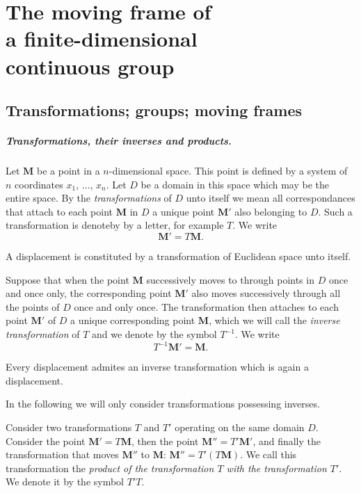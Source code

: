 \chapter[{The moving frame of a finite-dimensional continuous group}]{The moving frame of\\a finite-dimensional\\continuous group}
\label{cha:moving-frame-finite}

\section{Transformations; groups; moving frames}
\label{sec:transf-group-moving}
\paragraph{Transformations, their inverses and products.}
\label{sec:58}
Let $\mathbf{M}$ be a point in a $n$-dimensional space. This point is defined by a system of $n$ coordinates $x_{1}$, $\dots$, $x_{n}$. Let $D$ be a domain in this space which may be the entire space. By the \emph{transformations} of $D$ unto itself we mean all correspondances that attach to each point $\mathbf{M}$ in $D$ a unique point $\mathbf{M}'$ also belonging to $D$. Such a transformation is denoteby by a letter, for example $T$. We write
\[
\mathbf{M}'=T\mathbf{M}.
\]

\begin{ex}
  A displacement is constituted by a transformation of Euclidean space unto itself.
\end{ex}

Suppose that when the point $\mathbf{M}$ successively moves to through points in $D$ once and once only, the corresponding point $\mathbf{M}'$ also moves successively through all the points of $D$ once and only once. The transformation then attaches to each point $\mathbf{M}'$ of $D$ a unique corresponding point $\mathbf{M}$, which we will call the \emph{inverse transformation} of $T$ and we denote by the symbol $T^{-1}$. We write
\[
T^{-1}\mathbf{M}'=\mathbf{M}.
\]

\begin{ex}
  Every displacement admites an inverse transformation which is again a displacement.
\end{ex}

In the following we will only consider transformations possessing inverses.

Consider two transformations $T$ and $T'$ operating on the same domain $D$. Consider the point $\mathbf{M}'=T\mathbf{M}$, then the point $\mathbf{M}''=T'\mathbf{M}'$, and finally the transformation that moves $\mathbf{M}''$ to $\mathbf{M}$: $\mathbf{M}''=T'(T\mathbf{M})$. We call this transformation the \emph{product of the transformation $T$ with the transformation $T'$}. We denote it by the symbol $T'T$.

